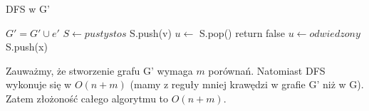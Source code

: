 \documentclass{article}
\begin{document}
\newpage
\begin{algorithm}
\caption{DFS w G'}
\begin{algorithmic}[1]
\State $G' = G' \cup e'$
\EndIf
\EndFor
\State $S \gets pustystos$
\State S.push(v)
\State $u \gets$ S.pop()
\State return false
\EndIf
{}
\State $u \gets odwiedzony$
\State S.push(x)
\EndIf
\EndFor
\EndWhile
\end{algorithmic}
\end{algorithm}
Zauważmy, że stworzenie grafu G' wymaga $m$ porównań. Natomiast DFS wykonuje się w $O(n+m)$ (mamy z reguły mniej krawędzi w grafie G' niż w G). Zatem złożoność całego algorytmu to $O(n+m)$.
\end{document}
